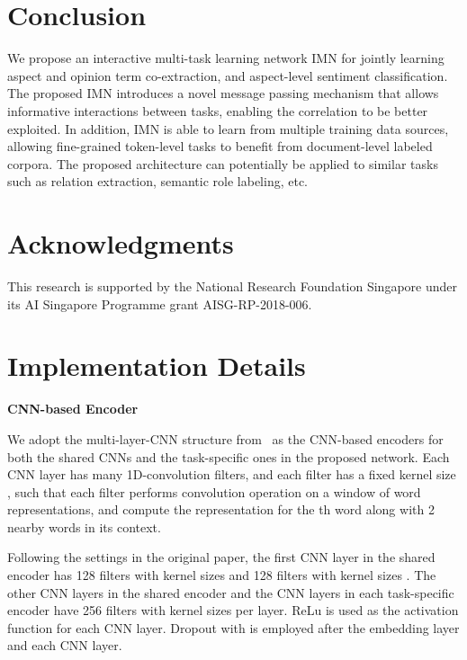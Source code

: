 \documentclass[11pt,a4paper]{article}
\begin{document}
\section{Conclusion}

We propose an interactive multi-task learning network IMN for jointly learning aspect and opinion term co-extraction, and aspect-level sentiment classification. The proposed IMN introduces a novel message passing mechanism that allows informative interactions between tasks, enabling the correlation to be better exploited. In addition, IMN is able to learn from multiple training data sources, allowing fine-grained token-level tasks to benefit from document-level labeled corpora. The proposed architecture can potentially be applied to similar tasks such as relation extraction, semantic role labeling, etc. 

\section*{Acknowledgments}
This research is supported by the National Research Foundation Singapore under its AI Singapore Programme grant AISG-RP-2018-006.






\appendix
\section{Implementation Details}
\label{sec:enc}

\textbf{CNN-based Encoder}

\noindent We adopt the multi-layer-CNN structure from~\citep{hu:18} as the CNN-based encoders for both the shared CNNs and the task-specific ones in the proposed network. 
Each CNN layer has many 1D-convolution filters, and each filter has a fixed kernel size , such that each filter performs convolution operation on a window of  word representations, and compute the representation for the th word along with 2 nearby words in its context.

Following the settings in the original paper, the first CNN layer in the shared encoder has 128 filters with kernel sizes  and 128 filters with kernel sizes . The other CNN layers in the shared encoder and the CNN layers in each task-specific encoder have 256 filters with kernel sizes  per layer. ReLu is used as the activation function for each CNN layer. Dropout with  is employed after the embedding layer and each CNN layer. 
\end{document}
